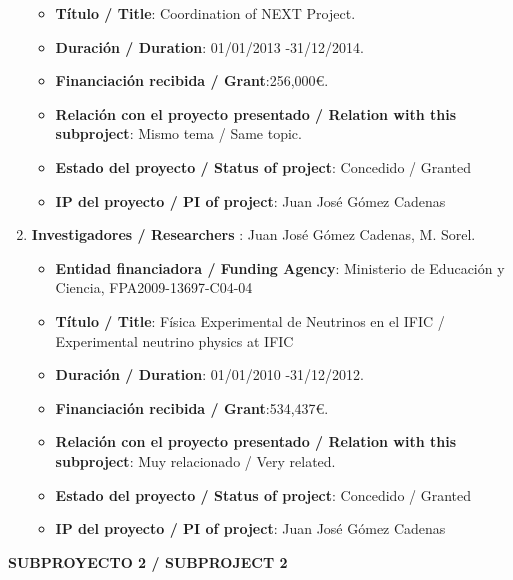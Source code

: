 \begin{enumerate}
\begin{itemize}
\item {\bf Título / Title}:  Coordination of NEXT Project.
\item {\bf Duración / Duration}: 01/01/2013 -31/12/2014. 
\item {\bf Financiación recibida / Grant}:256,000\euro. 
\item {\bf Relación con el proyecto presentado / Relation with this subproject}: Mismo tema / Same topic. 
\item {\bf Estado del proyecto / Status of project}: Concedido / Granted
\item {\bf IP del proyecto / PI of project}: Juan José Gómez Cadenas 
\end{itemize}
\item {\bf Investigadores / Researchers }: Juan José Gómez Cadenas, M. Sorel.
\begin{itemize}
\item {\bf Entidad financiadora / Funding Agency}:  Ministerio de Educaci\'on y Ciencia, FPA2009-13697-C04-04
\item {\bf Título / Title}:  Física Experimental de Neutrinos en el IFIC / Experimental neutrino physics at IFIC
\item {\bf Duración / Duration}: 01/01/2010 -31/12/2012. 
\item {\bf Financiación recibida / Grant}:534,437\euro. 
\item {\bf Relación con el proyecto presentado / Relation with this subproject}: Muy relacionado / Very related. 
\item {\bf Estado del proyecto / Status of project}: Concedido / Granted
\item {\bf IP del proyecto / PI of project}: Juan José Gómez Cadenas 
\end{itemize}
\end{enumerate}

\vspace{12pt}

\noindent\textbf{SUBPROYECTO 2 / SUBPROJECT 2}

